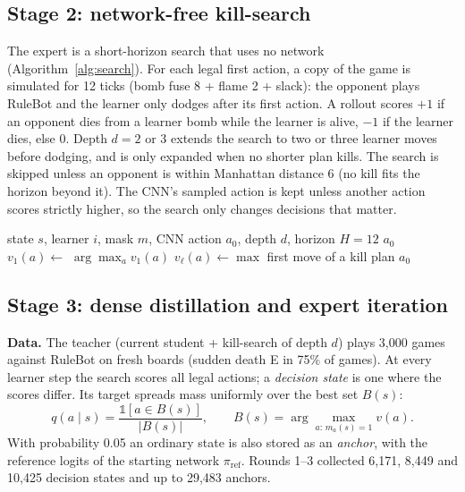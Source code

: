 \documentclass[11pt]{article}
\begin{document}
\subsection{Stage 2: network-free kill-search}
The expert is a short-horizon search that uses no network (Algorithm~\ref{alg:search}). For each legal first action, a copy of the game is simulated for 12 ticks (bomb fuse 8 + flame 2 + slack): the opponent plays RuleBot and the learner only dodges after its first action. A rollout scores $+1$ if an opponent dies from a learner bomb while the learner is alive, $-1$ if the learner dies, else 0. Depth $d=2$ or 3 extends the search to two or three learner moves before dodging, and is only expanded when no shorter plan kills. The search is skipped unless an opponent is within Manhattan distance 6 (no kill fits the horizon beyond it). The CNN's sampled action is kept unless another action scores strictly higher, so the search only changes decisions that matter.

\begin{algorithm}[t]
\caption{Kill-search of depth $d$ (play time)}
\label{alg:search}
\small
\begin{algorithmic}[1]
\Require state $s$, learner $i$, mask $m$, CNN action $a_0$, depth $d$, horizon $H=12$
 \Return $a_0$ \EndIf
{}
  \State $v_1(a)\gets$  
\EndFor
{} \Return $\arg\max_a v_1(a)$ \EndIf
{} 
    \State $v_\ell(a)\gets\max$ 
  \EndFor
   \Return first move of a kill plan \EndIf
\EndFor
\State \Return $a_0$
\end{algorithmic}
\end{algorithm}

\subsection{Stage 3: dense distillation and expert iteration}
\textbf{Data.} The teacher (current student + kill-search of depth $d$) plays 3{,}000 games against RuleBot on fresh boards (sudden death E in 75\% of games). At every learner step the search scores all legal actions; a \emph{decision state} is one where the scores differ. Its target spreads mass uniformly over the best set $B(s)$:
\begin{equation}
q(a\mid s)=\frac{\mathbb{1}[a\in B(s)]}{|B(s)|},\qquad B(s)=\arg\max_{a:\,m_a(s)=1} v(a).
\end{equation}
With probability 0.05 an ordinary state is also stored as an \emph{anchor}, with the reference logits of the starting network $\pi_{\mathrm{ref}}$. Rounds 1--3 collected 6{,}171, 8{,}449 and 10{,}425 decision states and up to 29{,}483 anchors.
\end{document}
